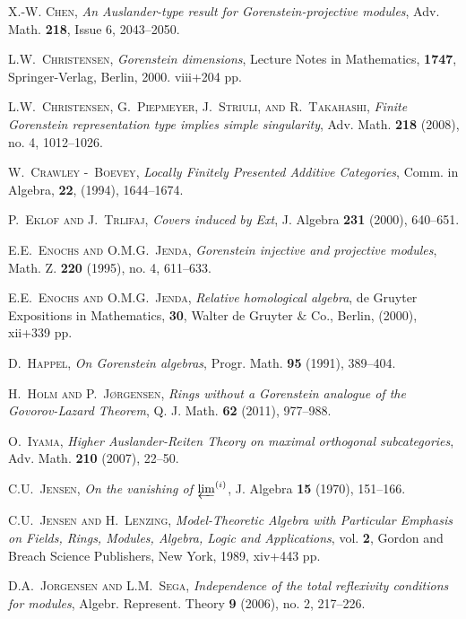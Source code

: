 \documentclass[oneside, a4paper,reqno]{amsart}
\numberwithin{equation}{section}
\theoremstyle{definition}
\begin{document}
\begin{thebibliography}{99}
\textsc{X.-W. Chen}, \textit{An Auslander-type result for
Gorenstein-projective modules},  Adv. Math.
{\bf 218}, Issue 6, 2043--2050.

\textsc{L.W.~Christensen}, \textit{Gorenstein dimensions},  Lecture
Notes in Mathematics, {\bf 1747}, Springer-Verlag, Berlin, 2000.
viii+204 pp.

\textsc{L.W.~Christensen, G.~Piepmeyer, J.~Striuli, and R.~Takahashi},
\textit{Finite Gorenstein representation type implies simple singularity},
Adv. Math. {\bf 218} (2008), no. 4, 1012--1026.

\textsc{W.~Crawley -~Boevey}, \textit{Locally Finitely Presented
Additive Categories}, Comm. in Algebra, {\bf 22}, (1994),
1644--1674.

\textsc{P.~Eklof and J.~Trlifaj}, \textit{Covers induced by Ext}, J.
Algebra {\bf 231} (2000), 640--651.

\textsc{E.E.~Enochs and O.M.G.~Jenda}, \textit{Gorenstein injective and
projective modules},  Math. Z. {\bf 220} (1995), no. 4, 611--633.

\textsc{E.E.~Enochs and O.M.G.~Jenda}, \textit{Relative homological algebra}, de Gruyter
Expositions in Mathematics, {\bf 30}, Walter de Gruyter $\&$ Co.,
Berlin, (2000), xii+339 pp.

\textsc{D.~Happel}, \textit{On Gorenstein algebras}, Progr. Math. {\bf 95} (1991), 389--404.

\textsc{H.~Holm and P.~J{\o}rgensen}, \textit{Rings without a Gorenstein analogue of the Govorov-Lazard Theorem},
Q. J. Math. {\bf 62} (2011), 977--988. 

\textsc{O.~Iyama}, \textit{Higher Auslander-Reiten Theory on maximal
orthogonal subcategories}, Adv. Math. {\bf 210} (2007), 22--50.

\textsc{C.U.~Jensen}, \textit{On the vanishing of $\operatorname*{\varprojlim}\sp{(i)}$}, J.
Algebra {\bf 15} (1970), 151--166.

\textsc{C.U.~Jensen and H.~Lenzing}, \textit{Model-Theoretic Algebra with
Particular Emphasis on Fields, Rings, Modules, Algebra, Logic and
Applications}, vol. {\bf 2}, Gordon and Breach Science Publishers,
New York, 1989, xiv+443 pp.

\textsc{D.A.~Jorgensen and L.M.~Sega},  \textit{Independence of the
total reflexivity conditions for modules}, Algebr. Represent. Theory
{\bf 9} (2006),  no. 2, 217--226.


\end{thebibliography}
\end{document}
